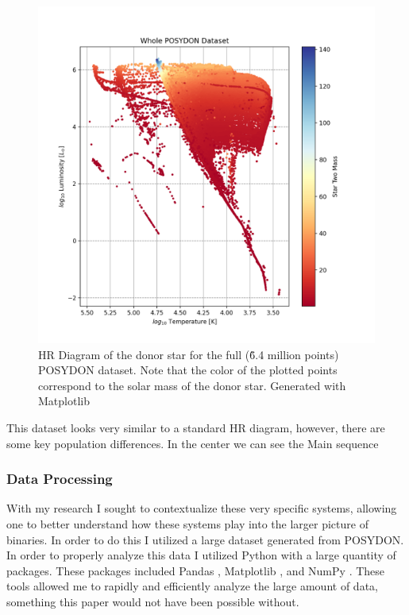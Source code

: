 \documentclass[12pt, a4paper]{article}
\begin{document}
        \begin{figure} [H]
            \centering
            \includegraphics[width = \textwidth]{figs/GeneratedFigs/WholePOSYDONDatasetExample.png}
            \caption{HR Diagram of the donor star for the full (\~6.4 million points) POSYDON dataset. Note that the color of the plotted points correspond to the solar mass of the donor star. Generated with Matplotlib}
            \label{EntireDataSetHR}
        \end{figure}
        

        This dataset looks very similar to a standard HR diagram, however, there are some key population differences. In the center we can see the Main sequence
        \subsubsection{Data Processing}
            With my research I sought to contextualize these very specific systems, allowing one to better understand how these systems play into the larger picture of binaries. In order to do this I utilized a large dataset generated from POSYDON. In order to properly analyze this data I utilized Python with a large quantity of packages. These packages included Pandas \parencite{reback2020pandas}, Matplotlib \parencite{Matplotlib}, and NumPy \parencite{harris2020array}. These tools allowed me to rapidly and efficiently analyze the large amount of data, something this paper would not have been possible without.
\end{document}
